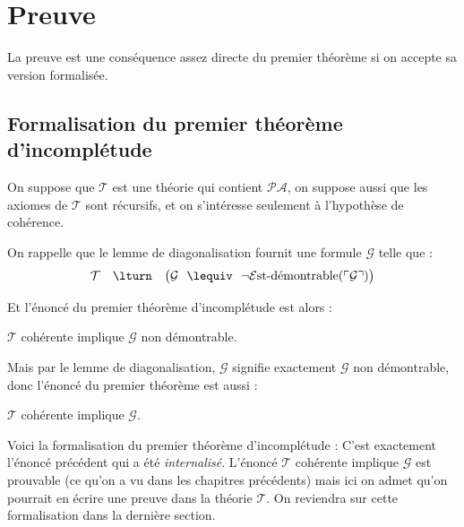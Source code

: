 \documentclass[11pt,class=report,crop=false]{standalone}
\begin{document}
\section{Preuve}

La preuve est une conséquence assez directe du premier théorème si on accepte sa version formalisée.

\subsection{Formalisation du premier théorème d'incomplétude}

On suppose que $\mathcal{T}$ est une théorie qui contient $\mathcal{PA}$, on suppose aussi que les axiomes de $\mathcal{T}$ sont récursifs, et on s'intéresse seulement à l'hypothèse de cohérence.

On rappelle que le lemme de diagonalisation fournit une formule $\mathcal{G}$ telle que :
\[
  \mathcal{T} \quad \lturn \quad \big(\mathcal{G} \ \ \lequiv \ \ \lnot\mathcal{E}\text{st-démontrable}(\ulcorner \mathcal{G} \urcorner) \big)
\]

Et l'énoncé du premier théorème d'incomplétude est alors :
\begin{center}
  $\mathcal{T}$ cohérente implique $\mathcal{G}$ non démontrable.
\end{center}

Mais par le lemme de diagonalisation, $\mathcal{G}$ signifie exactement \og{}$\mathcal{G}$ non démontrable\fg{}, donc l'énoncé du premier théorème est aussi :
\begin{center}
  $\mathcal{T}$ cohérente implique $\mathcal{G}$.
\end{center}

\bigskip

Voici la formalisation du premier théorème d'incomplétude :
C'est exactement l'énoncé précédent qui a été \emph{internalisé}. L'énoncé \og{}$\mathcal{T}$ cohérente implique $\mathcal{G}$\fg{} est prouvable (ce qu'on a vu dans les chapitres précédents) mais ici on admet qu'on pourrait en écrire une preuve dans la théorie $\mathcal{T}$. On reviendra sur cette formalisation dans la dernière section.


\end{document}
